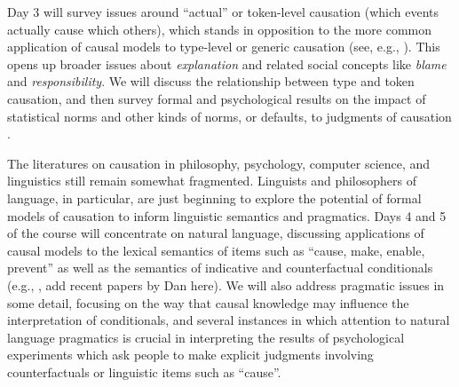 \documentclass[english]{article}
\begin{document}

Day 3 will survey issues around ``actual'' or token-level causation (which events actually cause which others), which stands in opposition to the more common application of causal models to type-level or generic causation (see, e.g., \citealt{halpernpearl05a,halpernpearl05b}). This opens up broader issues about \emph{explanation} and related social concepts like \emph{blame} and \emph{responsibility}. We will discuss the relationship between type and token causation, and then survey formal and psychological results on the impact of statistical norms and other kinds of norms, or defaults, to judgments of causation \citep{halpern2015graded,Icard2017}.

The literatures on causation in philosophy, psychology, computer science, and linguistics still remain somewhat fragmented. Linguists and philosophers of language, in particular, are just beginning to explore the potential of formal models of causation to inform linguistic semantics and pragmatics. Days 4 and 5 of the course will concentrate on natural language, discussing applications of causal models to the lexical semantics of items such as ``cause, make, enable, prevent'' \citep{wolff03,sloman09} as well as the semantics of indicative and counterfactual conditionals (e.g., \citealt{pearl00,schulz07,sloman05b,deghanietal12,kaufmann13}, add recent papers by Dan here). We will also address pragmatic issues in some detail, focusing on the way that causal knowledge may influence the interpretation of conditionals, and several instances in which attention to natural language pragmatics is crucial in interpreting the results of psychological experiments which ask people to make explicit judgments involving counterfactuals or linguistic items such as ``cause''.
\end{document}
